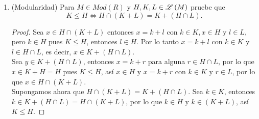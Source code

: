 \documentclass{article}
\begin{document}
\begin{enumerate}[label=\textbf{Ej \arabic*.}]
		\item (Modularidad) Para $M\in Mod(R)$ y $H,K,L\in \mathscr{L}\left(M\right) $ pruebe que 
		\[K\leq H\iff H\cap (K+L)=K+(H\cap L).\]
		\begin{proof}
			Sea $x\in H\cap(K+L)$ entonces $x=k+l$ con $k\in K, x\in H$ y $l\in L$, pero $k\in H$ pues $K\leq H$, entonces $l\in H$. Por lo tanto
			$x=k+l$ con $k\in K$ y $l\in H\cap L$, es decir, $x\in K+(H\cap L)$.\\
			
			Sea $y\in K+(H\cap L)$, entonces $x=k+r$ para alguna $r\in H\cap L$, por lo que $x\in K+H=H$ pues $K\leq H$, así $x\in H$ y $x=k+r$
			con $k\in K$ y $r\in L$, por lo que $x\in H\cap(K+L)$.\\
			
			Supongamos ahora que $H\cap (K+L)=K+(H\cap L)$. Sea $k\in K$, entonces $k\in K+(H\cap L)=H\cap(K+L)$, por lo que 
			$k\in H$ y $k\in (K+L)$, así $K\leq H$.
		\end{proof}
		

\end{enumerate}
\end{document}
